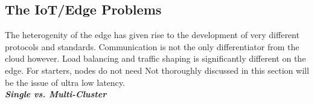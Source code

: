 \subsection{The IoT/Edge Problems} \label{edgeIoT}
The heterogenity of the edge has given rise to the development of very different protocols and standards. Communication is not the only differentiator from the cloud however. Load balancing and traffic shaping is significantly different on the edge. For starters, nodes do not need 
Not thoroughly discussed in this section will be the issue of ultra low latency. 
\vspace{0.5mm} \ \\
\textbf{\textit{Single vs. Multi-Cluster}}\\






